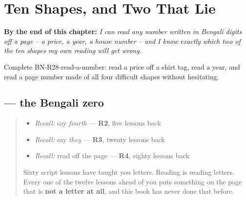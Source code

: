 
\chapter{Ten Shapes, and Two That Lie}
\label{ch:bn-digits}

\begin{chapteropening}
\textbf{By the end of this chapter:} \emph{I can read any number written in Bengali digits off a page -- a price, a year, a house number -- and I know exactly which two of the ten shapes my own reading will get wrong.}

Complete BN-R28-read-a-number: read a price off a shirt tag, read a year, and read a page number made of all four difficult shapes without hesitating.
\end{chapteropening}

\section[\texorpdfstring{\bn{০} (digit zero)}{০ (digit zero)}]{ — the Bengali zero}

\label{lesson:BN-W07-digit-zero}



\begin{quote}
\begin{itemize}
\raggedright
  \item \emph{Recall:} say \emph{fourth} — \textbf{R2}, five lessons back
  \item \emph{Recall:} say \emph{they} — \textbf{R3}, twenty lessons back
  \item \emph{Recall:} read \textbf{} off the page — \textbf{R4}, eighty lessons back
\end{itemize}

Sixty script lessons have taught you letters. Reading \textbf{} is reading letters. Every one of the twelve lessons ahead of you puts something on the page that is \textbf{not a letter at all}, and this book has never done that before.
\end{quote}

